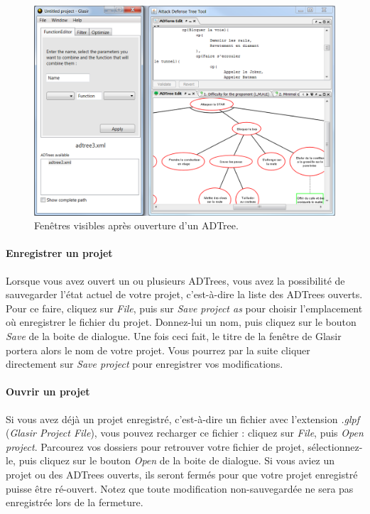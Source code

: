     \begin{figure}[H]
        \centering
        \includegraphics[height=0.7\textwidth]{figure/glasirAditoule.png}
        \caption{Fenêtres visibles après ouverture d'un ADTree.}
        \label{fig:gladitoule}
    \end{figure}

\paragraph{Enregistrer un projet} Lorsque vous avez ouvert un ou plusieurs ADTrees, vous avez la possibilité de sauvegarder l'état actuel de votre projet, c'est-à-dire la liste des ADTrees ouverts. Pour ce faire, cliquez sur \emph{File}, puis sur \emph{Save project as} pour choisir l'emplacement où enregistrer le fichier du projet. Donnez-lui un nom, puis cliquez sur le bouton \emph{Save} de la boite de dialogue. Une fois ceci fait, le titre de la fenêtre de Glasir portera alors le nom de votre projet. Vous pourrez par la suite cliquer directement sur \emph{Save project} pour enregistrer vos modifications.

\paragraph{Ouvrir un projet} Si vous avez déjà un projet enregistré, c'est-à-dire un fichier avec l'extension \emph{.glpf} (\emph{Glasir Project File}), vous pouvez recharger ce fichier : cliquez sur \emph{File}, puis \emph{Open project}. Parcourez vos dossiers pour retrouver votre fichier de projet, sélectionnez-le, puis cliquez sur le bouton \emph{Open} de la boite de dialogue. Si vous aviez un projet ou des ADTrees ouverts, ils seront fermés pour que votre projet enregistré puisse être ré-ouvert. Notez que toute modification non-sauvegardée ne sera pas enregistrée lors de la fermeture.

